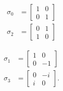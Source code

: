 	\begin{minipage}{0.5\textwidth}
	\vspace{0pt}
	\begin{align*}
	\sigma_0 &= \begin{bmatrix}1&0\\0&1\end{bmatrix}\\
	\sigma_2 &= \begin{bmatrix}0&1\\1&0\end{bmatrix}
	\end{align*}
	\end{minipage}
	\hfill
	\begin{minipage}{0.5\textwidth}
	\vspace{0pt}
	\begin{align*}
		\sigma_1 &= \begin{bmatrix}1&0\\0&-1\end{bmatrix}\\
		\sigma_3 &= \begin{bmatrix}0&-i\\i&0\end{bmatrix}.
	\end{align*}
	\end{minipage}


